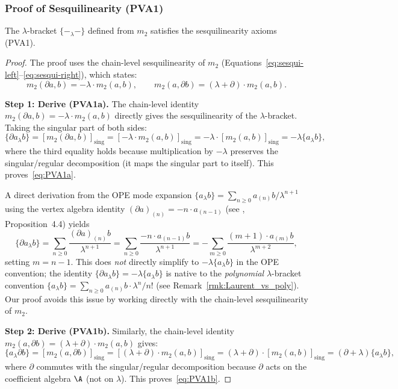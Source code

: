 \subsubsection{Proof of Sesquilinearity (PVA1)}

\begin{lemma}
The $\lambda$-bracket $\{-_\lambda -\}$ defined from $m_2$ satisfies the sesquilinearity axioms (PVA1).
\end{lemma}

\begin{proof}
The proof uses the chain-level sesquilinearity of $m_2$ (Equations~\eqref{eq:sesqui-left}--\eqref{eq:sesqui-right}), which states:
\[
m_2(\partial a, b) = -\lambda \cdot m_2(a, b), \qquad m_2(a, \partial b) = (\lambda + \partial) \cdot m_2(a,b).
\]

\textbf{Step 1: Derive (PVA1a).} The chain-level identity $m_2(\partial a, b) = -\lambda \cdot m_2(a,b)$ directly gives the sesquilinearity of the $\lambda$-bracket. Taking the singular part of both sides:
\[
\{\partial a_\lambda b\} = [m_2(\partial a, b)]_{\mathrm{sing}} = [-\lambda \cdot m_2(a,b)]_{\mathrm{sing}} = -\lambda \cdot [m_2(a,b)]_{\mathrm{sing}} = -\lambda \{a_\lambda b\},
\]
where the third equality holds because multiplication by $-\lambda$ preserves the singular/regular decomposition (it maps the singular part to itself). This proves~\eqref{eq:PVA1a}.

\begin{remark}
A direct derivation from the OPE mode expansion $\{a_\lambda b\} = \sum_{n \geq 0} a_{(n)} b / \lambda^{n+1}$ using the vertex algebra identity $(\partial a)_{(n)} = -n \cdot a_{(n-1)}$ (see \cite{Kac98}, Proposition~4.4) yields
\[
\{\partial a_\lambda b\} = \sum_{n \geq 0} \frac{(\partial a)_{(n)} b}{\lambda^{n+1}} = \sum_{n \geq 0} \frac{-n \cdot a_{(n-1)} b}{\lambda^{n+1}} = -\sum_{m \geq 0} \frac{(m+1) \cdot a_{(m)} b}{\lambda^{m+2}},
\]
setting $m = n-1$. This does \emph{not} directly simplify to $-\lambda \{a_\lambda b\}$ in the OPE convention; the identity $\{\partial a_\lambda b\} = -\lambda \{a_\lambda b\}$ is native to the \emph{polynomial} $\lambda$-bracket convention $\{a_\lambda b\} = \sum_{n \geq 0} a_{(n)} b \cdot \lambda^n / n!$ (see Remark~\ref{rmk:Laurent_vs_poly}). Our proof avoids this issue by working directly with the chain-level sesquilinearity of $m_2$.
\end{remark}

\textbf{Step 2: Derive (PVA1b).} Similarly, the chain-level identity $m_2(a, \partial b) = (\lambda + \partial) \cdot m_2(a,b)$ gives:
\[
\{a_\lambda \partial b\} = [m_2(a, \partial b)]_{\mathrm{sing}} = [(\lambda + \partial) \cdot m_2(a,b)]_{\mathrm{sing}} = (\lambda + \partial) \cdot [m_2(a,b)]_{\mathrm{sing}} = (\partial + \lambda) \{a_\lambda b\},
\]
where $\partial$ commutes with the singular/regular decomposition because $\partial$ acts on the coefficient algebra $\A$ (not on $\lambda$). This proves~\eqref{eq:PVA1b}.
\end{proof}

